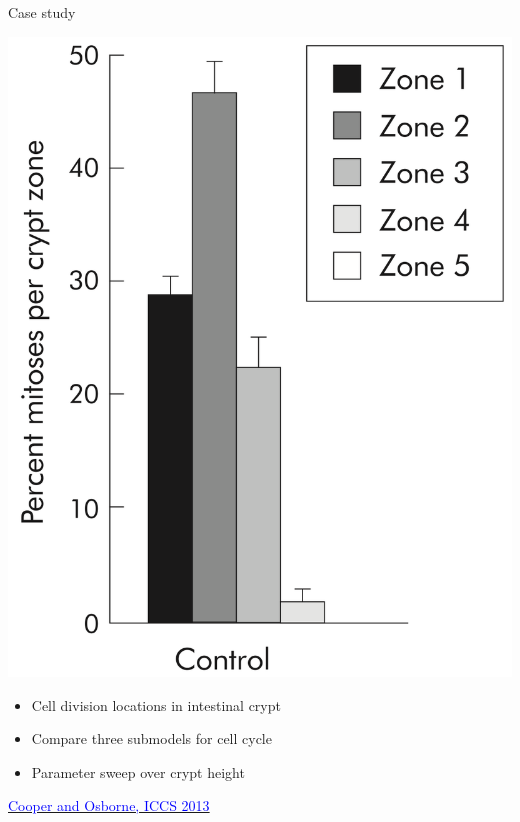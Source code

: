 \documentclass[t,xcolor={usenames,dvipsnames}]{beamer}
\newcommand{\myhref}[2]{\href{#1}{\textcolor{Blue}{#2}}}
\begin{document}
\begin{frame}{Case study}
\begin{minipage}{0.39\textwidth}
\includegraphics[width=.9\textwidth]{WongFigure}
\end{minipage}
\begin{minipage}{0.31\textwidth}
\begin{itemize}
\item Cell division locations in intestinal crypt
\item Compare three submodels for cell cycle
\item Parameter sweep over crypt height
\end{itemize}
\end{minipage}
\vspace{.4cm}
\begin{center}
\tiny
\myhref{http://dx.doi.org/10.1016/j.procs.2013.05.235}{Cooper and Osborne, ICCS 2013}
\end{center}
\end{frame}
\end{document}
